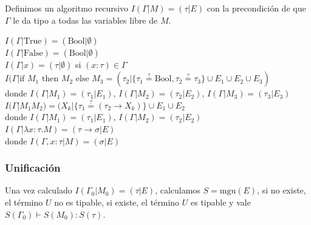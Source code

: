 \documentclass[12pt]{extarticle}
\def\equ{\overset{?}{=}}
\def\True{\text{True}}
\def\False{\text{False}}
\def\Bool{\text{Bool}}
\newcommand\ifelse[3]{\text{if }#1\text{ then }#2\text{ else }#3}
\begin{document}
Definimos un algoritmo recursivo $I(\Gamma | M) = (\tau | E)$ con la precondición de que $\Gamma$ le da tipo a todas las variables libre de $M$.

$I(\Gamma | \True) = (\Bool | \emptyset )$ \\
$I(\Gamma | \False) = (\Bool | \emptyset)$ \\
$I(\Gamma | x) = (\tau | \emptyset)$ si $(x: \tau) \in \Gamma$ \\
$I(\Gamma | \ifelse{M_1}{M_2}{M_3} = (\tau_2 | \{\tau_1 \equ \Bool, \tau_2 \equ \tau_3\} \cup E_1 \cup E_2 \cup E_3)$ \\
donde $I(\Gamma | M_1) = (\tau_1 | E_1)$, $I(\Gamma | M_2) = (\tau_2 | E_2)$, $I(\Gamma | M_3) = (\tau_3 | E_3)$ \\
$I(\Gamma | M_1 M_2) = (X_k | \{\tau_1 \equ (\tau_2 \rightarrow X_k)\} \cup E_1 \cup E_2$ \\
donde $I(\Gamma | M_1) = (\tau_1 | E_1)$, $I(\Gamma | M_2) = (\tau_2 | E_2)$ \\
$I(\Gamma | \lambda x : \tau. M) = (\tau \rightarrow \sigma | E)$ \\
donde $I(\Gamma, x : \tau | M) = (\sigma | E)$

\subsubsection{Unificación}
Una vez calculado $I(\Gamma_0 | M_0) = (\tau | E)$, calculamos $S = \text{mgu}(E)$, si no existe, el término $U$ no es tipable, si existe, el término $U$ es tipable y vale $S(\Gamma_0) \vdash S(M_0) : S(\tau)$.
\end{document}
